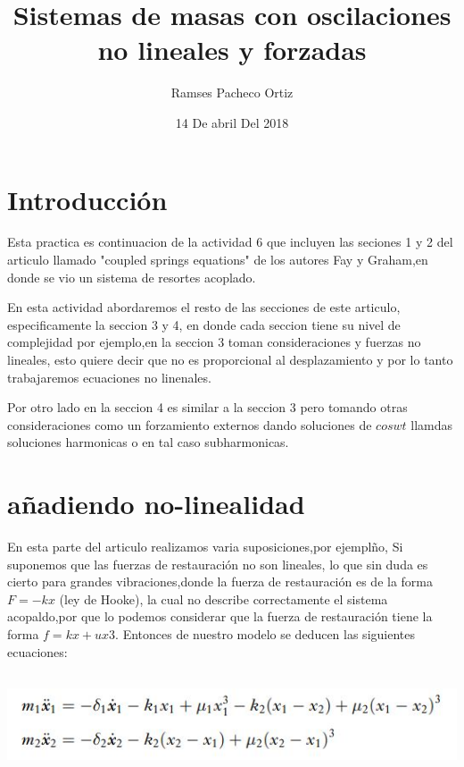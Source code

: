 \documentclass{article}
\begin{document}
\title{Sistemas de masas con oscilaciones no lineales y forzadas}
\author{Ramses Pacheco Ortiz}
\date{14 De abril Del 2018}
\maketitle  


\section{Introducción}

Esta practica es continuacion de la actividad 6 que incluyen las seciones 1 y 2 del articulo llamado "coupled springs equations" de los autores Fay y Graham,en donde se vio un sistema de resortes acoplado.

En esta actividad abordaremos el resto de las secciones de este articulo, especificamente la seccion 3 y 4, en donde cada seccion tiene su nivel de complejidad por ejemplo,en la seccion 3 toman consideraciones y fuerzas no lineales, esto quiere decir que no es proporcional al  desplazamiento y por lo tanto trabajaremos ecuaciones no linenales.

Por otro lado en la seccion 4 es similar a la seccion 3 pero tomando otras consideraciones como un forzamiento externos dando soluciones de $cos wt$ llamdas soluciones harmonicas o en tal caso subharmonicas.

\section{añadiendo no-linealidad}

En esta parte del articulo realizamos varia suposiciones,por ejemplño, Si suponemos que las fuerzas de restauración no son lineales, lo que sin duda es cierto para grandes vibraciones,donde la fuerza de restauración es de la forma $F=-kx$ (ley de Hooke), la cual no describe correctamente el sistema acopaldo,por que lo podemos considerar que la fuerza de restauración tiene la forma $f=kx+ux3$. Entonces de nuestro modelo se deducen las siguientes ecuaciones:

\begin{center}
\includegraphics[height=3cm]{ec14.png}
\end{center}
\end{document}
